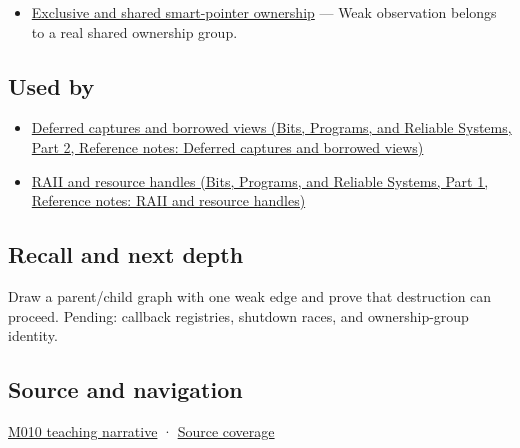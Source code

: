 \hypertarget{appendix-b9548675eb2b-prerequisites}{}

\begin{itemize}
\tightlist
\item
  \hyperref[appendix-51602cabe815]{Exclusive and shared smart-pointer ownership} --- Weak observation belongs to a real shared ownership group.
\end{itemize}

\subsection{Used by}\label{appendix-b9548675eb2b-used-by}

\hypertarget{appendix-b9548675eb2b-used-by}{}

\begin{itemize}
\tightlist
\item
  \href{../01-Bits-Programs-and-Reliable-Systems-P02/main.pdf\#appendix-aea529eb5175}{Deferred captures and borrowed views (Bits, Programs, and Reliable Systems, Part 2, Reference notes: Deferred captures and borrowed views)}
\item
  \href{../01-Bits-Programs-and-Reliable-Systems-P01/main.pdf\#appendix-69739d3ab49b}{RAII and resource handles (Bits, Programs, and Reliable Systems, Part 1, Reference notes: RAII and resource handles)}
\end{itemize}

\subsection{Recall and next depth}\label{appendix-b9548675eb2b-recall-and-next-depth}

\hypertarget{appendix-b9548675eb2b-recall-and-next-depth}{}

Draw a parent/child graph with one weak edge and prove that destruction can proceed. Pending: callback registries, shutdown races, and ownership-group identity.

\subsection{Source and navigation}\label{appendix-b9548675eb2b-source-and-navigation}

\hypertarget{appendix-b9548675eb2b-source-and-navigation}{}

\hyperref[01-foundations-i-ch004-weak-observation-breaks-cycles-without-pretending-an-object-is-alive]{M010 teaching narrative} · \hyperref[appendix-fd090d982a15-m010---parts-148-160]{Source coverage}
